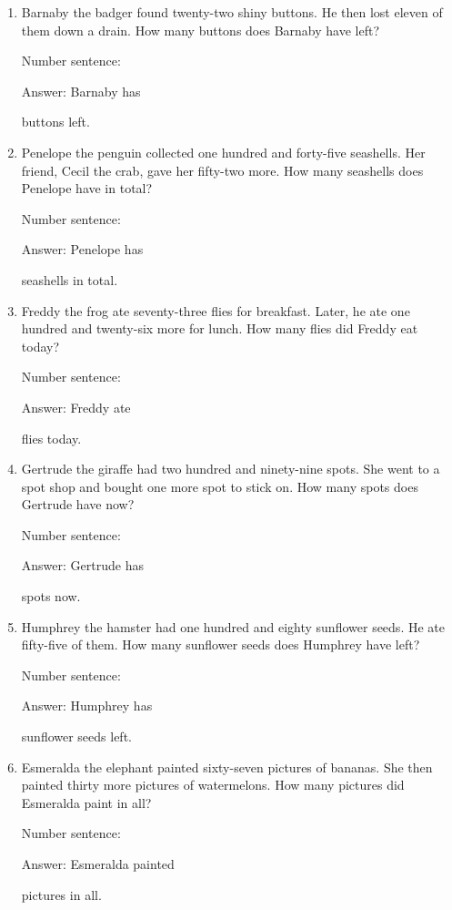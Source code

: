 \documentclass{tufte-book}
\begin{document}
\begin{enumerate}

\item
  Barnaby the badger found twenty-two shiny buttons. He then lost eleven
  of them down a drain. How many buttons does Barnaby have left?\medskip\par
  Number sentence:
  \dotfill\medskip\par
  Answer: Barnaby has
  \dotfill\medskip\par\mbox{}\dotfill\medskip\par\mbox{}\dotfill\bigskip
  buttons left.
\item
  Penelope the penguin collected one hundred and forty-five seashells.
  Her friend, Cecil the crab, gave her fifty-two more. How many
  seashells does Penelope have in total?\medskip\par
  Number sentence:
  \dotfill\medskip\par
  Answer: Penelope has
  \dotfill\medskip\par\mbox{}\dotfill\medskip\par\mbox{}\dotfill\bigskip
  seashells in total.
\item
  Freddy the frog ate seventy-three flies for breakfast. Later, he ate
  one hundred and twenty-six more for lunch. How many flies did Freddy
  eat today?\medskip\par
  Number sentence:
  \dotfill\medskip\par
  Answer: Freddy ate
  \dotfill\medskip\par\mbox{}\dotfill\medskip\par\mbox{}\dotfill\bigskip
  flies today.
\item
  Gertrude the giraffe had two hundred and ninety-nine spots. She went
  to a spot shop and bought one more spot to stick on. How many spots
  does Gertrude have now?\medskip\par
  Number sentence:
  \dotfill\medskip\par
  Answer: Gertrude has
  \dotfill\medskip\par\mbox{}\dotfill\medskip\par\mbox{}\dotfill\bigskip
  spots now.
\item
  Humphrey the hamster had one hundred and eighty sunflower seeds. He
  ate fifty-five of them. How many sunflower seeds does Humphrey have
  left?\medskip\par
  Number sentence:
  \dotfill\medskip\par
  Answer: Humphrey has
  \dotfill\medskip\par\mbox{}\dotfill\medskip\par\mbox{}\dotfill\bigskip
  sunflower seeds left.
\item
  Esmeralda the elephant painted sixty-seven pictures of bananas. She
  then painted thirty more pictures of watermelons. How many pictures
  did Esmeralda paint in all?\medskip\par
  Number sentence:
  \dotfill\medskip\par
  Answer: Esmeralda painted
  \dotfill\medskip\par\mbox{}\dotfill\medskip\par\mbox{}\dotfill\bigskip
  pictures in all.
\end{enumerate}
\end{document}
